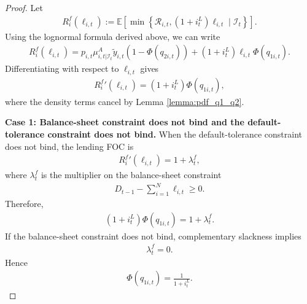 \documentclass[12pt]{article}
\numberwithin{equation}{section}
\begin{document}
\begin{appendix}
\begin{proof}
    Let
    \begin{align*}
        R^f_i(\ell_{i,t})
        :=
        \mathbb{E}
        \left[
        \min\left\{
        \mathcal{R}_{i,t},(1+i^L_t)\ell_{i,t}
        \mid \mathcal{I}_t \right\}
        \right].
    \end{align*}
    Using the lognormal formula derived above, we can write
    \begin{align*}
        R^f_i(\ell_{i,t})
        =
        p_{i,t}\mu^A_{i, t|\mathcal{I}_t}\tilde{y}_{i,t}
        \left(1-\Phi(q_{2i,t})\right)
        +
        (1+i^L_t)\ell_{i,t}\Phi(q_{1i,t}).
    \end{align*}
    Differentiating with respect to $\ell_{i,t}$ gives
    \begin{align*}
        {R^f_i}'(\ell_{i,t})
        =
        (1+i^L_t)\Phi(q_{1i,t}),
    \end{align*}
    where the density terms cancel by Lemma \ref{lemma:pdf_q1_q2}.

    \noindent\textbf{Case 1: Balance-sheet constraint does not bind and the default-tolerance constraint does not bind.}
    When the default-tolerance constraint does not bind, the lending FOC is
    \begin{align*}
        {R^f_i}'(\ell_{i,t})
        =
        1+\lambda^f_t,
    \end{align*}
    where $\lambda^f_t$ is the multiplier on the balance-sheet constraint
    \begin{align*}
        D_{t-1}-\sum_{i=1}^N\ell_{i,t}\geq 0.
    \end{align*}
    Therefore,
    \begin{align*}
        (1+i^L_t)\Phi(q_{1i,t})
        =
        1+\lambda^f_t.
    \end{align*}
    If the balance-sheet constraint does not bind, complementary slackness implies
    \begin{align*}
        \lambda^f_t=0.
    \end{align*}
    Hence
    \begin{align*}
        \Phi(q_{1i,t})
        =
        \frac{1}{1+i^L_t}.
    \end{align*}


\end{proof}
\end{appendix}
\end{document}
